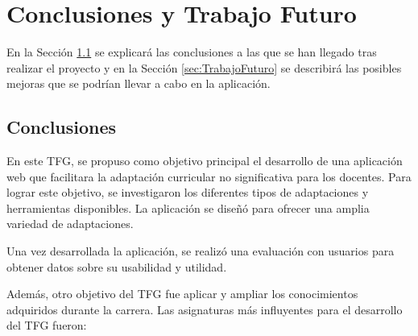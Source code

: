 \chapter{Conclusiones y Trabajo Futuro}
\label{cap:conclusiones}

En la Sección \ref{sec:conclusiones} se explicará las conclusiones a las que se han llegado tras realizar el proyecto y en la Sección \ref{sec:TrabajoFuturo} se describirá las posibles mejoras que se podrían llevar a cabo en la aplicación.

\section{Conclusiones}
\label{sec:conclusiones}
En este TFG, se propuso como objetivo principal el desarrollo de una aplicación web que facilitara la adaptación curricular no significativa para los docentes. Para lograr este objetivo, se investigaron los diferentes tipos de adaptaciones y herramientas disponibles. La aplicación se diseñó para ofrecer una amplia variedad de adaptaciones.

Una vez desarrollada la aplicación, se realizó una evaluación con usuarios para obtener datos sobre su usabilidad y utilidad.

Además, otro objetivo del TFG fue aplicar y ampliar los conocimientos adquiridos durante la carrera. Las asignaturas más influyentes para el desarrollo del TFG fueron: 

